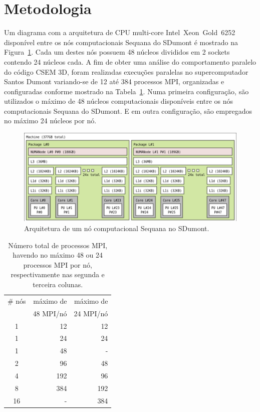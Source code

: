\documentclass[12pt]{article}
\begin{document}
\section{Metodologia}
\label{sec:metodo}
%
Um diagrama com a arquitetura de CPU multi-core Intel\textregistered~Xeon\textregistered~Gold~6252 disponível entre os nós computacionais Sequana do SDumont é mostrado na Figura~\ref{fig:sequananode}. Cada um destes nós possuem 48 núcleos divididos em 2 sockets contendo 24 núcleos cada. A fim de obter uma análise do comportamento paralelo do código CSEM 3D, foram realizadas execuções paralelas no supercomputador Santos Dumont variando-se de 12 até 384 processos MPI, organizadas e configuradas conforme mostrado na Tabela~\ref{tab:parallelconfig}. Numa primeira configuração, são utilizados o máximo de 48 núcleos computacionais disponíveis entre os nós computacionais Sequana do SDumont. E em outra configuração, são empregados no máximo 24 núcleos por nó.
%
\begin{figure}
\centering
\includegraphics[width=.66\textwidth]{figures/sequanacpudev.png}
\caption{Arquitetura de um nó computacional Sequana no SDumont.}
\label{fig:sequananode}
\end{figure}
%
\begin{table}
\centering
\footnotesize
\caption{Número total de processos MPI, havendo no máximo 48 ou 24 processos MPI por nó, respectivamente nas segunda e terceira colunas.}
\label{tab:parallelconfig}
\begin{tabular}{crr}
\hline
\# nós	&	máximo de	&	máximo de	\\
	&	48 MPI/nó	&	24 MPI/nó	\\
\hline
1	&	12	&	12	\\
1	&	24	&	24	\\
1	&	48	&	 -	\\
2	&	96	&	48	\\
4	&	192	&	96	\\
8	&	384	&	192	\\
16	&	 -	&	384	\\
\hline
\end{tabular}
\end{table}
\end{document}
